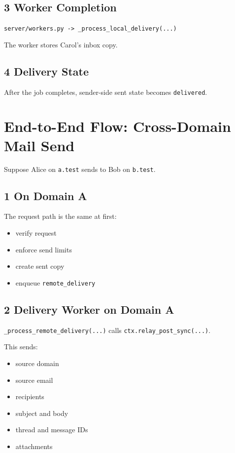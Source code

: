 \documentclass[11pt,a4paper]{article}
\begin{document}
\subsection{3 Worker Completion}

\nolinkurl{server/workers.py -> _process_local_delivery(...)}

The worker stores Carol's inbox copy.

\subsection{4 Delivery State}

After the job completes, sender-side sent state becomes \nolinkurl{delivered}.


\section{End-to-End Flow: Cross-Domain Mail Send}

Suppose Alice on \nolinkurl{a.test} sends to Bob on \nolinkurl{b.test}.

\subsection{1 On Domain A}

The request path is the same at first:

\begin{itemize}
\item verify request
\item enforce send limits
\item create sent copy
\item enqueue \nolinkurl{remote_delivery}
\end{itemize}

\subsection{2 Delivery Worker on Domain A}

\nolinkurl{_process_remote_delivery(...)} calls \nolinkurl{ctx.relay_post_sync(...)}.

This sends:

\begin{itemize}
\item source domain
\item source email
\item recipients
\item subject and body
\item thread and message IDs
\item attachments
\end{itemize}
\end{document}
